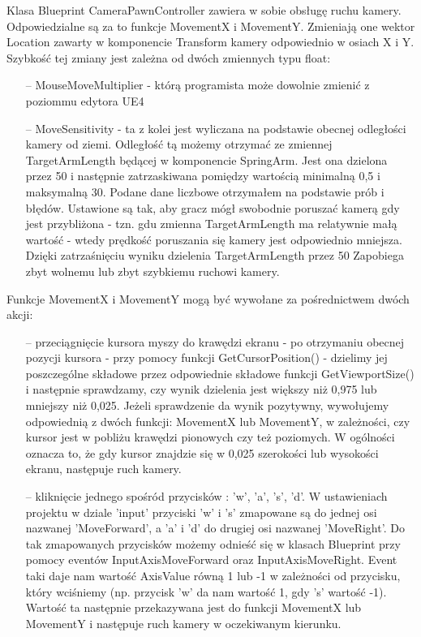 \documentclass[12pt]{report}
\begin{document}
Klasa Blueprint CameraPawnController zawiera w sobie obsługę ruchu kamery. Odpowiedzialne są za to funkcje MovementX i MovementY. Zmieniają one wektor Location zawarty w komponencie Transform kamery odpowiednio w osiach X i Y. Szybkość tej zmiany jest zależna od dwóch zmiennych typu float: 
\begin{itemize}
\item[--] MouseMoveMultiplier - którą programista może dowolnie zmienić z poziommu edytora UE4
\item[--] MoveSensitivity - ta z kolei jest wyliczana na podstawie obecnej odległości kamery od ziemi. Odległość tą możemy otrzymać ze zmiennej TargetArmLength będącej w komponencie SpringArm. Jest ona dzielona przez 50 i następnie zatrzaskiwana pomiędzy wartością minimalną 0,5 i maksymalną 30. Podane dane liczbowe otrzymałem na podstawie prób i błędów. Ustawione są tak, aby gracz mógł swobodnie poruszać kamerą gdy jest przybliżona - tzn. gdu zmienna TargetArmLength ma relatywnie małą   wartość - wtedy prędkość poruszania się kamery jest odpowiednio mniejsza. Dzięki zatrzaśnięciu wyniku dzielenia TargetArmLength przez 50 Zapobiega zbyt wolnemu lub zbyt szybkiemu ruchowi kamery.
\end{itemize}



Funkcje MovementX i MovementY mogą być wywołane za pośrednictwem dwóch akcji:

\begin{itemize}
\item[--] przeciągnięcie kursora myszy do krawędzi ekranu - po otrzymaniu obecnej pozycji kursora - przy pomocy funkcji GetCursorPosition() - dzielimy jej poszczególne składowe przez odpowiednie składowe funkcji GetViewportSize() i następnie sprawdzamy, czy wynik dzielenia jest większy niż 0,975 lub mniejszy niż 0,025. Jeżeli sprawdzenie da wynik pozytywny, wywołujemy odpowiednią z dwóch funkcji: MovementX lub MovementY, w zależności, czy kursor jest w pobliżu krawędzi pionowych czy też poziomych. W ogólności oznacza to, że gdy kursor znajdzie się w 0,025 szerokości lub wysokości ekranu, następuje ruch kamery. 
\item[--] kliknięcie jednego spośród przycisków : 'w', 'a', 's', 'd'. W ustawieniach projektu w dziale 'input' przyciski 'w' i 's' zmapowane są do jednej osi nazwanej 'MoveForward', a 'a' i 'd' do drugiej osi nazwanej 'MoveRight'. Do tak zmapowanych przycisków możemy odnieść się w klasach Blueprint przy pomocy eventów InputAxisMoveForward oraz InputAxisMoveRight. Event taki daje nam wartość AxisValue równą 1 lub -1 w zależności od przycisku, który wciśniemy (np. przycisk 'w' da nam wartość 1, gdy 's' wartość -1). Wartość ta następnie przekazywana jest do funkcji MovementX lub MovementY i następuje ruch kamery w oczekiwanym kierunku.
\end{itemize}
\end{document}
